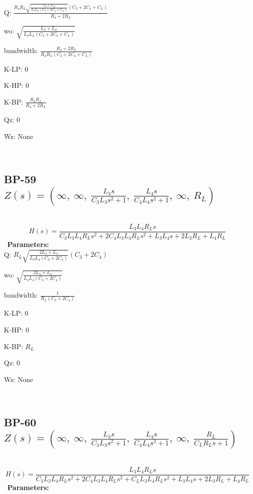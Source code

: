 \documentclass{article}
\begin{document}
Q: $\frac{R_{4} R_{L} \sqrt{\frac{L_{3} + L_{L}}{L_{3} L_{L} \left(C_{3} + 2 C_{4} + C_{L}\right)}} \left(C_{3} + 2 C_{4} + C_{L}\right)}{R_{4} + 2 R_{L}}$\ 

wo: $\sqrt{\frac{L_{3} + L_{L}}{L_{3} L_{L} \left(C_{3} + 2 C_{4} + C_{L}\right)}}$\ 

bandwidth: $\frac{R_{4} + 2 R_{L}}{R_{4} R_{L} \left(C_{3} + 2 C_{4} + C_{L}\right)}$\ 

K-LP: $0$\ 

K-HP: $0$\ 

K-BP: $\frac{R_{4} R_{L}}{R_{4} + 2 R_{L}}$\ 

Qz: $0$\ 

Wz: $\text{None}$\ 

\ 

\subsection{BP-59 $Z(s) = \left( \infty, \  \infty, \  \frac{L_{3} s}{C_{3} L_{3} s^{2} + 1}, \  \frac{L_{4} s}{C_{4} L_{4} s^{2} + 1}, \  \infty, \  R_{L}\right)$ } \ 
\textbf{\[H(s) = \frac{L_{3} L_{4} R_{L} s}{C_{3} L_{3} L_{4} R_{L} s^{2} + 2 C_{4} L_{3} L_{4} R_{L} s^{2} + L_{3} L_{4} s + 2 L_{3} R_{L} + L_{4} R_{L}}\] } \ 
\textbf{Parameters:}\\ 

Q: $R_{L} \sqrt{\frac{2 L_{3} + L_{4}}{L_{3} L_{4} \left(C_{3} + 2 C_{4}\right)}} \left(C_{3} + 2 C_{4}\right)$\ 

wo: $\sqrt{\frac{2 L_{3} + L_{4}}{L_{3} L_{4} \left(C_{3} + 2 C_{4}\right)}}$\ 

bandwidth: $\frac{1}{R_{L} \left(C_{3} + 2 C_{4}\right)}$\ 

K-LP: $0$\ 

K-HP: $0$\ 

K-BP: $R_{L}$\ 

Qz: $0$\ 

Wz: $\text{None}$\ 

\ 

\subsection{BP-60 $Z(s) = \left( \infty, \  \infty, \  \frac{L_{3} s}{C_{3} L_{3} s^{2} + 1}, \  \frac{L_{4} s}{C_{4} L_{4} s^{2} + 1}, \  \infty, \  \frac{R_{L}}{C_{L} R_{L} s + 1}\right)$ } \ 
\textbf{\[H(s) = \frac{L_{3} L_{4} R_{L} s}{C_{3} L_{3} L_{4} R_{L} s^{2} + 2 C_{4} L_{3} L_{4} R_{L} s^{2} + C_{L} L_{3} L_{4} R_{L} s^{2} + L_{3} L_{4} s + 2 L_{3} R_{L} + L_{4} R_{L}}\] } \ 
\textbf{Parameters:}\\ 
\end{document}
